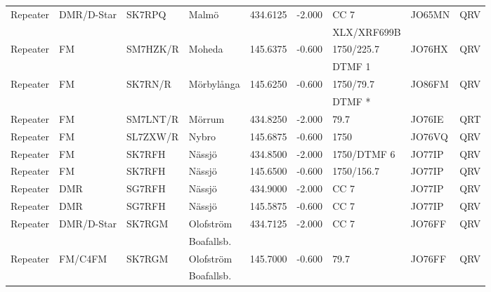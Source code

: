 \begin{landscape}
\begin{longtable}{llllrrlll}
Repeater & DMR/D-Star      & SK7RPQ   & Malmö        & 434.6125     & -2.000     & CC 7         & JO65MN      & QRV      \\
         &                 &          &              &              &            & XLX/XRF699B  &             &          \\
Repeater & FM              & SM7HZK/R & Moheda       & 145.6375     & -0.600     & 1750/225.7   & JO76HX      & QRV      \\
         &                 &          &              &              &            & DTMF 1       &             &          \\
Repeater & FM              & SK7RN/R  & Mörbylånga   & 145.6250     & -0.600     & 1750/79.7    & JO86FM      & QRV      \\
         &                 &          &              &              &            & DTMF *       &             &          \\
Repeater & FM              & SM7LNT/R & Mörrum       & 434.8250     & -2.000     & 79.7         & JO76IE      & QRT      \\
Repeater & FM              & SL7ZXW/R & Nybro        & 145.6875     & -0.600     & 1750         & JO76VQ      & QRV      \\
Repeater & FM              & SK7RFH   & Nässjö       & 434.8500     & -2.000     & 1750/DTMF 6  & JO77IP      & QRV      \\
Repeater & FM              & SK7RFH   & Nässjö       & 145.6500     & -0.600     & 1750/156.7   & JO77IP      & QRV      \\
Repeater & DMR             & SG7RFH   & Nässjö       & 434.9000     & -2.000     & CC 7         & JO77IP      & QRV      \\
Repeater & DMR             & SG7RFH   & Nässjö       & 145.5875     & -0.600     & CC 7         & JO77IP      & QRV      \\
Repeater & DMR/D-Star      & SK7RGM   & Olofström    & 434.7125     & -2.000     & CC 7         & JO76FF      & QRV      \\
         &                 &          & Boafallsb.   &              &            &              &             &          \\
Repeater & FM/C4FM         & SK7RGM   & Olofström    & 145.7000     & -0.600     & 79.7         & JO76FF      & QRV      \\
         &                 &          & Boafallsb.   &              &            &              &             &          \\

\end{longtable}
\end{landscape}
